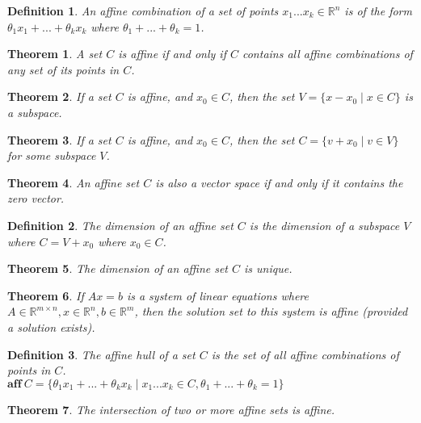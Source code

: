 \documentclass[a4paper]{article}
\newtheorem{mytheorem}{Theorem}
\newtheorem{mydef}{Definition}
\numberwithin{mytheorem}{section}
\numberwithin{mydef}{section}
\numberwithin{example}{section}
\begin{document}
\begin{mydef} An affine combination of a set of points $x_{1}...x_{k} \in \mathbb{R}^{n}$ is of the form $\theta_{1}x_{1} + ... + \theta_{k}x_{k}$ where $\theta_{1} + ... + \theta_{k} = 1$.
\end{mydef}

\begin{mytheorem} A set $C$ is affine if and only if $C$ contains all affine combinations of any set of its points in $C$. \end{mytheorem}

\begin{mytheorem} If a set $C$ is affine, and $x_{0} \in C$, then the set $V = \{ x - x_{0} \mid x \in C \}$ is a subspace.  \end{mytheorem}

\begin{mytheorem} If a set $C$ is affine, and $x_{0} \in C$, then the set $C = \{ v + x_{0} \mid v \in V \}$ for some subspace $V$.  \end{mytheorem}

\begin{mytheorem} An affine set $C$ is also a vector space if and only if it contains the zero vector.  \end{mytheorem}

\begin{mydef} The dimension of an affine set $C$ is the dimension of a subspace $V$ where $C = V + x_{0}$ where $x_{0} \in C$. \end{mydef}

\begin{mytheorem} The dimension of an affine set $C$ is unique. \end{mytheorem}

\begin{mytheorem} If $Ax = b$ is a system of linear equations where $A \in \mathbb{R}^{m \times n}, x \in \mathbb{R}^{n}, b \in \mathbb{R}^{m}$, then the solution set to this system is affine (provided a solution exists). \end{mytheorem}

\begin{mydef} The affine hull of a set $C$ is the set of all affine combinations of points in $C$. \\
$\textbf{aff} \ C = \{ \theta_{1}x_{1} + ... + \theta_{k}x_{k} \mid x_{1}...x_{k} \in C, \theta_{1} + ... + \theta_{k} = 1  \}$ \end{mydef}

\begin{mytheorem} The intersection of two or more affine sets is affine. \end{mytheorem}
\end{document}
